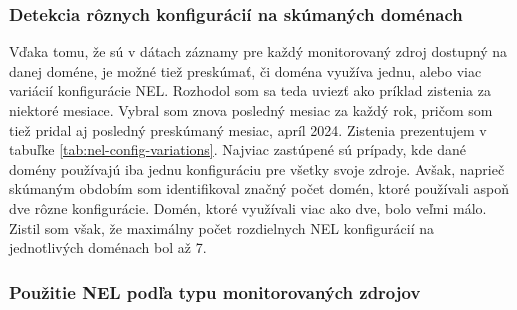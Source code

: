 \subsubsection{Detekcia rôznych konfigurácií na skúmaných doménach}

Vďaka tomu, že sú v dátach záznamy pre každý monitorovaný zdroj dostupný na danej doméne, je možné tiež preskúmať, či doména využíva jednu, alebo viac variácií konfigurácie NEL.
Rozhodol som sa teda uviezť ako príklad zistenia za niektoré mesiace.
Vybral som znova posledný mesiac za každý rok, pričom som tiež pridal aj posledný preskúmaný mesiac, apríl 2024.
Zistenia prezentujem v tabuľke \ref{tab:nel-config-variations}.
Najviac zastúpené sú prípady, kde dané domény používajú iba jednu konfiguráciu pre všetky svoje zdroje.
Avšak, naprieč skúmaným obdobím som identifikoval značný počet domén, ktoré používali aspoň dve rôzne konfigurácie.
Domén, ktoré využívali viac ako dve, bolo veľmi málo.
Zistil som však, že maximálny počet rozdielnych NEL konfigurácií na jednotlivých doménach bol až 7.

\begin{table}[!htb]
\centering
{}
\caption{\centering Počty domén s rôznym počtom rozdielnych NEL konfigurácií pre vybrané dátumy.}
\label{tab:nel-config-variations}
\end{table}

\subsubsection{Použitie NEL podľa typu monitorovaných zdrojov}

